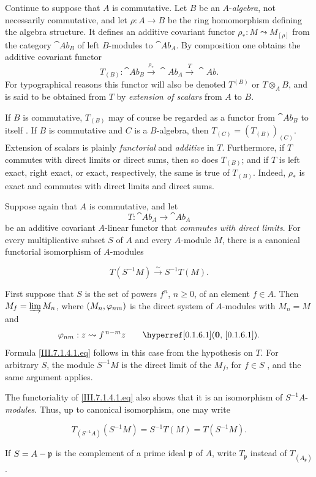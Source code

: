 \begin{env}[7.1.3]
\label{III.7.1.3}
Continue to suppose that $A$ is commutative.  Let $B$ be an
$A$-\emph{algebra}, not necessarily commutative, and let $\rho:A\longrightarrow B$
be the ring homomorphism defining the algebra structure.  It
defines an
additive covariant functor $\rho_*:M\leadsto M_{[\rho]}$
from the category $\cat{Ab}_B$ of left $B$-modules to
$\cat{Ab}_A$.  By composition one obtains the additive
covariant functor
\[
  T_{(B)}:
  \cat{Ab}_B
  \xrightarrow{\rho_*}
  \cat{Ab}_A
  \xrightarrow{T}
  \cat{Ab}.
\]
For typographical reasons this functor will also be denoted
$T^{(B)}$ or $T\otimes_AB$, and is said to be obtained from $T$
by \emph{extension of scalars} from $A$ to $B$.

If $B$ is commutative, $T_{(B)}$ may of course be regarded as a
functor from $\cat{Ab}_B$ to itself .  If $B$ is
commutative and $C$ is a $B$-algebra, then $T_{(C)}=(T_{(B)})_{(C)}$.
Extension of scalars is plainly \emph{functorial} and \emph{additive} in
$T$.  Furthermore, if $T$ commutes with direct limits or direct
sums, then so does $T_{(B)}$; and if $T$ is left exact, right
exact, or exact, respectively, the same is true of $T_{(B)}$.
Indeed, $\rho_*$ is exact and commutes with direct limits and
direct sums.
\end{env}

\begin{env}[7.1.4]
\label{III.7.1.4}
Suppose again that $A$ is commutative, and let
\[
  T:\cat{Ab}_A\longrightarrow\cat{Ab}_A
\]
be an additive covariant $A$-linear functor that \emph{commutes with
direct limits}.  For every multiplicative subset $S$ of $A$ and
every $A$-module $M$, there is a canonical functorial
isomorphism of $A$-modules
\begin{env}[7.1.4.1]
\label{III.7.1.4.1}
\[
  T(S^{-1}M)
  \xrightarrow{\sim}
  S^{-1}T(M).
  \tag{7.1.4.1}\label{III.7.1.4.1.eq}
\]
\end{env}

First suppose that $S$ is the set of powers $f^n$,
$n\geq0$, of an element $f\in A$.  Then $M_f=\varinjlim M_n$,
where $(M_n,\varphi_{nm})$ is the direct system of $A$-modules
with $M_n=M$ and
\[
  \vphi_{nm}:z\leadsto f^{\,n-m}z
  \qquad\text{\sref[0]{0.1.6.1}}.
\]
Formula \eqref{III.7.1.4.1.eq} follows in this case from the
hypothesis on $T$.  For arbitrary $S$, the module $S^{-1}M$ is
the direct limit of the $M_f$, for $f\in S$
, and the same argument applies.

The functoriality of \eqref{III.7.1.4.1.eq} also shows that it
is an isomorphism of $S^{-1}A$-\emph{modules}.  Thus, up to canonical
isomorphism, one may write
\begin{env}[7.1.4.2]
\label{III.7.1.4.2}
\[
  T_{(S^{-1}A)}(S^{-1}M)
  =
  S^{-1}T(M)
  =
  T(S^{-1}M).
  \tag{7.1.4.2}\label{III.7.1.4.2.eq}
\]
\end{env}
If $S=A-\mathfrak p$ is the complement of a prime ideal
$\mathfrak p$ of $A$, write $T_{\mathfrak p}$ instead of
$T_{(A_{\mathfrak p})}$.
\end{env}

